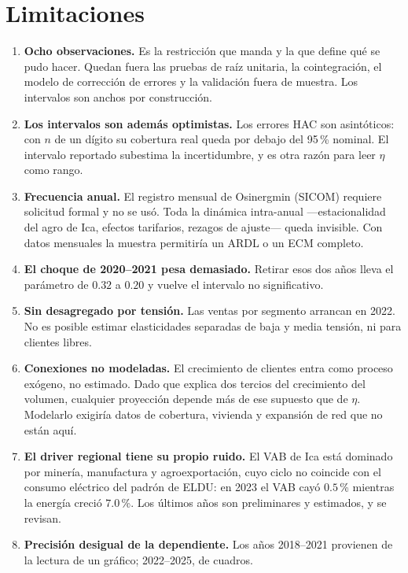 \documentclass[11pt,a4paper]{article}
\begin{document}
\section{Limitaciones}

\begin{enumerate}
  \item \textbf{Ocho observaciones.} Es la restricción que manda y la que define
  qué se pudo hacer. Quedan fuera las pruebas de raíz unitaria, la
  cointegración, el modelo de corrección de errores y la validación fuera de
  muestra. Los intervalos son anchos por construcción.
  \item \textbf{Los intervalos son además optimistas.} Los errores HAC son
  asintóticos: con $n$ de un dígito su cobertura real queda por debajo del
  95\,\% nominal. El intervalo reportado subestima la incertidumbre, y es otra
  razón para leer $\eta$ como rango.
  \item \textbf{Frecuencia anual.} El registro mensual de Osinergmin (SICOM)
  requiere solicitud formal y no se usó. Toda la dinámica intra-anual
  ---estacionalidad del agro de Ica, efectos tarifarios, rezagos de ajuste---
  queda invisible. Con datos mensuales la muestra permitiría un ARDL o un ECM
  completo.
  \item \textbf{El choque de 2020--2021 pesa demasiado.} Retirar esos dos años
  lleva el parámetro de $0{.}32$ a $0{.}20$ y vuelve el intervalo no
  significativo.
  \item \textbf{Sin desagregado por tensión.} Las ventas por segmento arrancan
  en 2022. No es posible estimar elasticidades separadas de baja y media
  tensión, ni para clientes libres.
  \item \textbf{Conexiones no modeladas.} El crecimiento de clientes entra como
  proceso exógeno, no estimado. Dado que explica dos tercios del crecimiento del
  volumen, cualquier proyección depende más de ese supuesto que de $\eta$.
  Modelarlo exigiría datos de cobertura, vivienda y expansión de red que no
  están aquí.
  \item \textbf{El driver regional tiene su propio ruido.} El VAB de Ica está
  dominado por minería, manufactura y agroexportación, cuyo ciclo no coincide
  con el consumo eléctrico del padrón de ELDU: en 2023 el VAB cayó $0{.}5$\,\%
  mientras la energía creció $7{.}0$\,\%. Los últimos años son preliminares y
  estimados, y se revisan.
  \item \textbf{Precisión desigual de la dependiente.} Los años 2018--2021
  provienen de la lectura de un gráfico; 2022--2025, de cuadros.
\end{enumerate}
\end{document}
